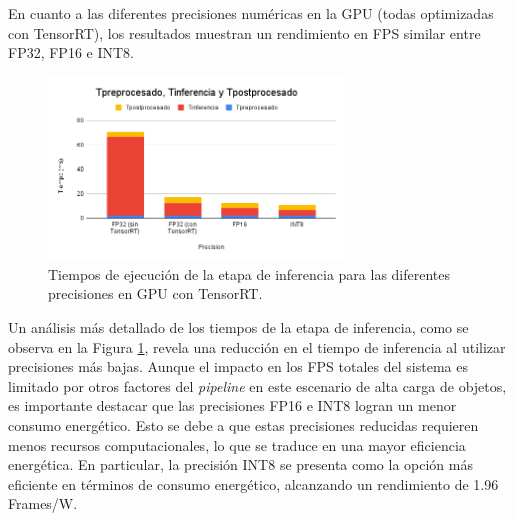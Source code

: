 \documentclass[11pt,spanish,listoffigures,listoftables]{tfgetsinf}
\begin{document}
En cuanto a las diferentes precisiones numéricas en la GPU (todas optimizadas con TensorRT), los resultados muestran un rendimiento en FPS similar entre FP32, FP16 e INT8.
\begin{figure}[H]
   \centering
   \includegraphics[width=0.7\textwidth]{images/analisis_de_la_solucion/precision_device/tiempos_inferencia_gpu.png}
   \caption[Tiempos de ejecución de la etapa de inferencia para las diferentes precisiones en GPU con TensorRT]{Tiempos de ejecución de la etapa de inferencia para las diferentes precisiones en GPU con TensorRT.}
   \label{fig:tiempos_inferencia_gpu}
\end{figure}
Un análisis más detallado de los tiempos de la etapa de inferencia, como se observa en la Figura \ref{fig:tiempos_inferencia_gpu}, revela una reducción en el tiempo de inferencia al utilizar precisiones más bajas. Aunque el impacto en los FPS totales del sistema es limitado por otros factores del \textit{pipeline} en este escenario de alta carga de objetos, es importante destacar que las precisiones FP16 e INT8 logran un menor consumo energético. Esto se debe a que estas precisiones reducidas requieren menos recursos computacionales, lo que se traduce en una mayor eficiencia energética. En particular, la precisión INT8 se presenta como la opción más eficiente en términos de consumo energético, alcanzando un rendimiento de 1.96 Frames/W.
\end{document}

